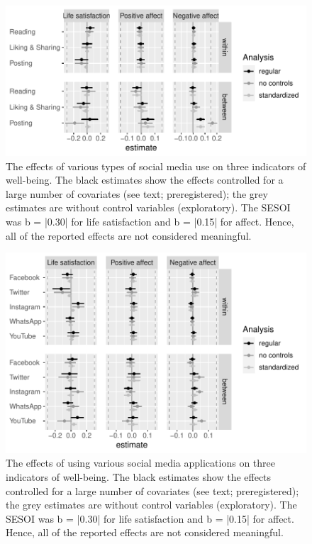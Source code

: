 \documentclass[
  man,mask]{apa6}
\begin{document}
\begin{figure}
\includegraphics[width=\textwidth]{manuscript_files/figure-latex/res-activity-1} \caption{The effects of various types of social media use on three indicators of well-being. The black estimates show the effects controlled for a large number of covariates (see text; preregistered); the grey estimates are without control variables (exploratory). The SESOI was b = |0.30| for life satisfaction and b = |0.15| for affect. Hence, all of the reported effects are not considered meaningful.}\label{fig:res-activity}
\end{figure}

\newpage

\begin{figure}
\includegraphics[width=\textwidth]{manuscript_files/figure-latex/res-channels-1} \caption{The effects of using various social media applications on three indicators of well-being. The black estimates show the effects controlled for a large number of covariates (see text; preregistered); the grey estimates are without control variables (exploratory). The SESOI was b = |0.30| for life satisfaction and b = |0.15| for affect. Hence, all of the reported effects are not considered meaningful.}\label{fig:res-channels}
\end{figure}
\end{document}
